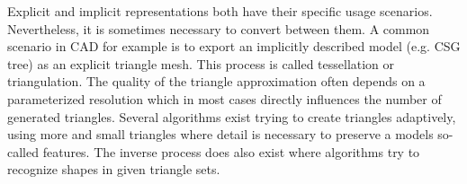 Explicit and implicit representations both have their specific usage scenarios. Nevertheless, it is sometimes necessary to convert between them.
A common scenario in CAD for example is to export an implicitly described model (e.g. CSG tree) as an explicit triangle mesh. This process is called tessellation or triangulation. The quality of the triangle approximation often depends on a parameterized resolution which in most cases directly influences the number of generated triangles. Several algorithms exist trying to create triangles adaptively, using more and small triangles where detail is necessary to preserve a models so-called features.
The inverse process does also exist where algorithms try to recognize shapes in given triangle sets.